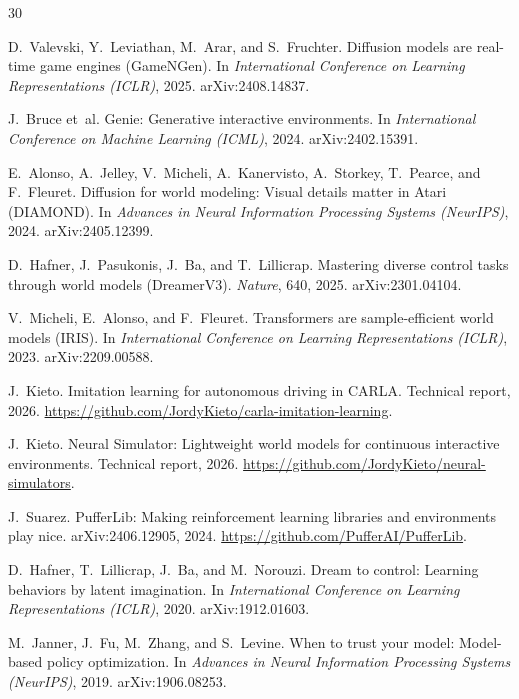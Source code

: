 \documentclass[11pt]{article}
\begin{document}

\begin{thebibliography}{30}

D.~Valevski, Y.~Leviathan, M.~Arar, and S.~Fruchter.
\newblock Diffusion models are real-time game engines (GameNGen).
\newblock In \emph{International Conference on Learning Representations (ICLR)}, 2025. arXiv:2408.14837.

J.~Bruce et~al.
\newblock Genie: Generative interactive environments.
\newblock In \emph{International Conference on Machine Learning (ICML)}, 2024. arXiv:2402.15391.

E.~Alonso, A.~Jelley, V.~Micheli, A.~Kanervisto, A.~Storkey, T.~Pearce, and F.~Fleuret.
\newblock Diffusion for world modeling: Visual details matter in Atari (DIAMOND).
\newblock In \emph{Advances in Neural Information Processing Systems (NeurIPS)}, 2024. arXiv:2405.12399.

D.~Hafner, J.~Pasukonis, J.~Ba, and T.~Lillicrap.
\newblock Mastering diverse control tasks through world models (DreamerV3).
\newblock \emph{Nature}, 640, 2025. arXiv:2301.04104.

V.~Micheli, E.~Alonso, and F.~Fleuret.
\newblock Transformers are sample-efficient world models (IRIS).
\newblock In \emph{International Conference on Learning Representations (ICLR)}, 2023. arXiv:2209.00588.

J.~Kieto.
\newblock Imitation learning for autonomous driving in CARLA.
\newblock Technical report, 2026. \url{https://github.com/JordyKieto/carla-imitation-learning}.

J.~Kieto.
\newblock Neural Simulator: Lightweight world models for continuous interactive environments.
\newblock Technical report, 2026. \url{https://github.com/JordyKieto/neural-simulators}.

J.~Suarez.
\newblock PufferLib: Making reinforcement learning libraries and environments play nice.
\newblock arXiv:2406.12905, 2024. \url{https://github.com/PufferAI/PufferLib}.

D.~Hafner, T.~Lillicrap, J.~Ba, and M.~Norouzi.
\newblock Dream to control: Learning behaviors by latent imagination.
\newblock In \emph{International Conference on Learning Representations (ICLR)}, 2020. arXiv:1912.01603.

M.~Janner, J.~Fu, M.~Zhang, and S.~Levine.
\newblock When to trust your model: Model-based policy optimization.
\newblock In \emph{Advances in Neural Information Processing Systems (NeurIPS)}, 2019. arXiv:1906.08253.


\end{thebibliography}
\end{document}

